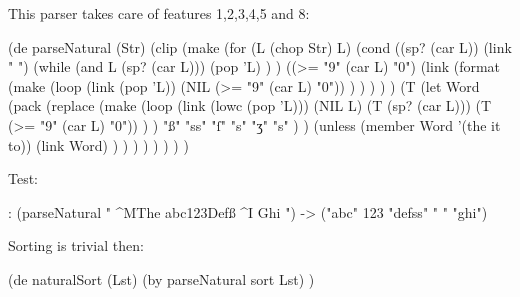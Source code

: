 \begin{wideverbatim}

This parser takes care of features 1,2,3,4,5 and 8:

(de parseNatural (Str)
   (clip
      (make
         (for (L (chop Str)  L)
            (cond
               ((sp? (car L))
                  (link " ")
                  (while (and L (sp? (car L)))
                     (pop 'L) ) )
               ((>= "9" (car L) "0")
                  (link
                     (format
                        (make
                           (loop
                              (link (pop 'L))
                              (NIL (>= "9" (car L) "0")) ) ) ) ) )
               (T
                  (let Word
                     (pack
                        (replace
                           (make
                              (loop
                                 (link (lowc (pop 'L)))
                                 (NIL L)
                                 (T (sp? (car L)))
                                 (T (>= "9" (car L) "0")) ) )
                            "ß" "ss" "ſ" "s" "ʒ" "s" ) )
                     (unless (member Word '(the it to))
                        (link Word) ) ) ) ) ) ) ) )

Test:

: (parseNatural " ^MThe abc123Defß ^I Ghi ")
-> ("abc" 123 "defss" " " "ghi")

Sorting is trivial then:

(de naturalSort (Lst)
   (by parseNatural sort Lst) )

\end{wideverbatim}

